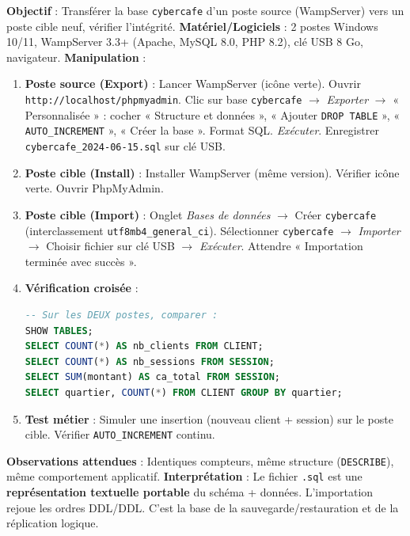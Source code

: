 \documentclass[11pt]{article}
\begin{document}
\begin{experience}
\textbf{Objectif} : Transférer la base \texttt{cybercafe} d'un poste source (WampServer) vers un poste cible neuf, vérifier l'intégrité.
\textbf{Matériel/Logiciels} : 2 postes Windows 10/11, WampServer 3.3+ (Apache, MySQL 8.0, PHP 8.2), clé USB 8 Go, navigateur.
\textbf{Manipulation} :
\begin{enumerate}
\item \textbf{Poste source (Export)} : Lancer WampServer (icône verte). Ouvrir \texttt{http://localhost/phpmyadmin}. Clic sur base \texttt{cybercafe} $\to$ \emph{Exporter} $\to$ « Personnalisée » : cocher « Structure et données », « Ajouter \texttt{DROP TABLE} », « \texttt{AUTO\_INCREMENT} », « Créer la base ». Format SQL. \emph{Exécuter}. Enregistrer \texttt{cybercafe\_2024-06-15.sql} sur clé USB.
\item \textbf{Poste cible (Install)} : Installer WampServer (même version). Vérifier icône verte. Ouvrir PhpMyAdmin.
\item \textbf{Poste cible (Import)} : Onglet \emph{Bases de données} $\to$ Créer \texttt{cybercafe} (interclassement \texttt{utf8mb4\_general\_ci}). Sélectionner \texttt{cybercafe} $\to$ \emph{Importer} $\to$ Choisir fichier sur clé USB $\to$ \emph{Exécuter}. Attendre « Importation terminée avec succès ».
\item \textbf{Vérification croisée} :
\begin{lstlisting}[language=SQL]
-- Sur les DEUX postes, comparer :
SHOW TABLES;
SELECT COUNT(*) AS nb_clients FROM CLIENT;
SELECT COUNT(*) AS nb_sessions FROM SESSION;
SELECT SUM(montant) AS ca_total FROM SESSION;
SELECT quartier, COUNT(*) FROM CLIENT GROUP BY quartier;
\end{lstlisting}
\item \textbf{Test métier} : Simuler une insertion (nouveau client + session) sur le poste cible. Vérifier \texttt{AUTO\_INCREMENT} continu.
\end{enumerate}
\textbf{Observations attendues} : Identiques compteurs, même structure (\texttt{DESCRIBE}), même comportement applicatif.
\textbf{Interprétation} : Le fichier \texttt{.sql} est une \textbf{représentation textuelle portable} du schéma + données. L'importation rejoue les ordres DDL/DDL. C'est la base de la sauvegarde/restauration et de la réplication logique.
\end{experience}
\end{document}
